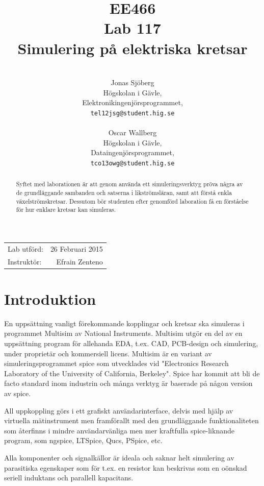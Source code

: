 \documentclass[11pt,a4paper]{article}
\title{EE466 \\ Lab 117 \\ Simulering på elektriska kretsar}
\author{\\
  Jonas Sjöberg\\
  Högskolan i Gävle,\\
  Elektronikingenjörsprogrammet,\\
  \texttt{tel12jsg@student.hig.se}\\
  \\
  Oscar Wallberg\\
  Högskolan i Gävle,\\
  Dataingenjörsprogrammet,\\
  \texttt{tco13owg@student.hig.se}\\}
\date{}
\begin{document}
\maketitle

\begin{center}
    \begin{tabular}{l r}
        Lab utförd: & 26 Februari 2015 \\
        Instruktör: & Efrain Zenteno
    \end{tabular}
\end{center}

\begin{abstract}
    Syftet med laborationen är att genom använda ett simuleringsverktyg pröva
    några av de grundläggande sambanden och satserna i likströmsläran, samt att
    förstå enkla växelströmskretsar. Dessutom bör studenten efter genomförd
    laboration få en förståelse för hur enklare kretsar kan simuleras.
\end{abstract}

\newpage

{
    \setcounter{tocdepth}{3}
    \tableofcontents
}

\newpage

\section{Introduktion}\label{setup}
En uppsättning vanligt förekommande kopplingar och kretsar ska simuleras i
programmet Multisim av National Instruments. Multisim utgör en del av en
uppsättning program för allehanda EDA, t.ex. CAD, PCB-design och simulering,
under proprietär och kommersiell licens. Multisim är en variant av
simuleringsprogrammet spice som utvecklades vid "Electronics Research
Laboratory of the University of California, Berkeley". Spice har kommit att bli
de facto standard inom industrin och många verktyg är baserade på någon version
av spice.

\par All uppkoppling görs i ett grafiskt användarinterface, delvis med hjälp av
virtuella mätinstrument men framförallt med den grundläggande funktionaliteten
som återfinns i mindre användarvänliga men mer kraftfulla spice-liknande
program, som ngspice, LTSpice, Qucs, PSpice, etc.
\par Alla komponenter och signalkällor är ideala och saknar helt simulering av
parasitiska egenskaper som för t.ex. en resistor kan beskrivas som en oönskad
seriell induktans och parallell kapacitans.
\end{document}
